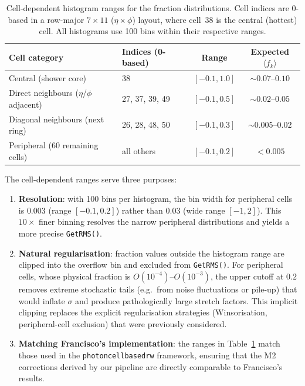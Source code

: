 \documentclass[11pt,a4paper]{article}
\begin{document}
\begin{table}[htbp]
\centering
\caption{Cell-dependent histogram ranges for the fraction distributions.
  Cell indices are 0-based in a row-major $7 \times 11$
  ($\eta \times \phi$) layout, where cell~38 is the central
  (hottest) cell.  All histograms use 100 bins within their respective
  ranges.}
\label{tab:cell-ranges}
\begin{tabular}{llcc}
\toprule
Cell category & Indices (0-based) & Range & Expected $\langle f_k \rangle$ \\
\midrule
Central (shower core)
  & 38
  & $[-0.1, 1.0]$
  & $\sim 0.07$--$0.10$ \\
Direct neighbours ($\eta$/$\phi$ adjacent)
  & 27, 37, 39, 49
  & $[-0.1, 0.5]$
  & $\sim 0.02$--$0.05$ \\
Diagonal neighbours (next ring)
  & 26, 28, 48, 50
  & $[-0.1, 0.3]$
  & $\sim 0.005$--$0.02$ \\
Peripheral (60 remaining cells)
  & all others
  & $[-0.1, 0.2]$
  & $< 0.005$ \\
\bottomrule
\end{tabular}
\end{table}

The cell-dependent ranges serve three purposes:
\begin{enumerate}
  \item \textbf{Resolution}: with 100 bins per histogram, the bin width
        for peripheral cells is $0.003$ (range $[-0.1, 0.2]$) rather
        than $0.03$ (wide range $[-1, 2]$).  This $10\times$ finer
        binning resolves the narrow peripheral distributions and yields
        a more precise \texttt{GetRMS()}.
  \item \textbf{Natural regularisation}: fraction values outside the
        histogram range are clipped into the overflow bin and excluded
        from \texttt{GetRMS()}.  For peripheral cells, whose physical
        fraction is $O(10^{-4})$--$O(10^{-3})$, the upper cutoff at
        $0.2$ removes extreme stochastic tails (e.g.\ from noise
        fluctuations or pile-up) that would inflate $\sigma$ and produce
        pathologically large stretch factors.  This implicit clipping
        replaces the explicit regularisation strategies (Winsorisation,
        peripheral-cell exclusion) that were previously considered.
  \item \textbf{Matching Francisco's implementation}: the ranges in
        Table~\ref{tab:cell-ranges} match those used in the
        \texttt{photoncellbasedrw} framework, ensuring that the M2
        corrections derived by our pipeline are directly comparable to
        Francisco's results.
\end{enumerate}
\end{document}

